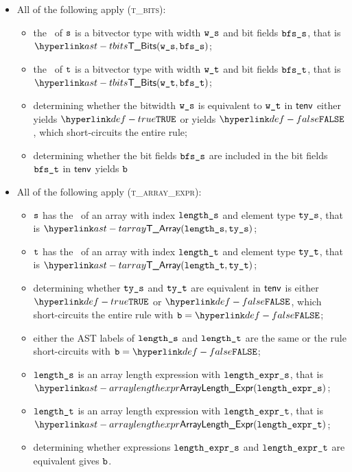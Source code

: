 \begin{itemize}
\item All of the following apply (\textsc{t\_bits}):
  \begin{itemize}
  \item the \underlyingtype\ of $\texttt{s}$ is a bitvector type with width $\texttt{w\_s}$ and bit fields $\texttt{bfs\_s}$, that is $\TBits(\ws, \bfss)$;
  \item the \underlyingtype\ of $\texttt{t}$ is a bitvector type with width $\texttt{w\_t}$ and bit fields $\texttt{bfs\_t}$, that is $\TBits(\wt, \bfst)$;
  \item determining whether the bitwidth $\texttt{w\_s}$ is equivalent to $\texttt{w\_t}$ in $\textsf{tenv}$ either yields $\True$ or yields $\False$,
        which short-circuits the entire rule;
  \item determining whether the bit fields $\texttt{bfs\_s}$ are included in the bit fields $\texttt{bfs\_t}$ in $\textsf{tenv}$ yields $\texttt{b}$\ProseOrTypeError
  \end{itemize}

\item All of the following apply (\textsc{t\_array\_expr}):
  \begin{itemize}
  \item $\texttt{s}$ has the \underlyingtype\ of an array with index $\texttt{length\_s}$ and element type $\texttt{ty\_s}$, that is $\TArray(\vlengths, \vtys)$;
  \item $\texttt{t}$ has the \underlyingtype\ of an array with index $\texttt{length\_t}$ and element type $\texttt{ty\_t}$, that is $\TArray(\vlengtht, \vtyt)$;
  \item determining whether $\texttt{ty\_s}$ and $\texttt{ty\_t}$ are equivalent in $\textsf{tenv}$ is either $\True$
  or $\False$, which short-circuits the entire rule with $\vb=\False$;
  \item either the AST labels of $\texttt{length\_s}$ and $\texttt{length\_t}$ are the same or the rule short-circuits with $\vb=\False$;
  \item $\texttt{length\_s}$ is an array length expression with $\texttt{length\_expr\_s}$, that is \\ $\ArrayLengthExpr(\vlengthexprs)$;
  \item $\texttt{length\_t}$ is an array length expression with $\texttt{length\_expr\_t}$, that is \\ $\ArrayLengthExpr(\vlengthexprt)$;
  \item determining whether expressions $\texttt{length\_expr\_s}$ and $\texttt{length\_expr\_t}$ are equivalent gives $\texttt{b}$.
  \end{itemize}


\end{itemize}
